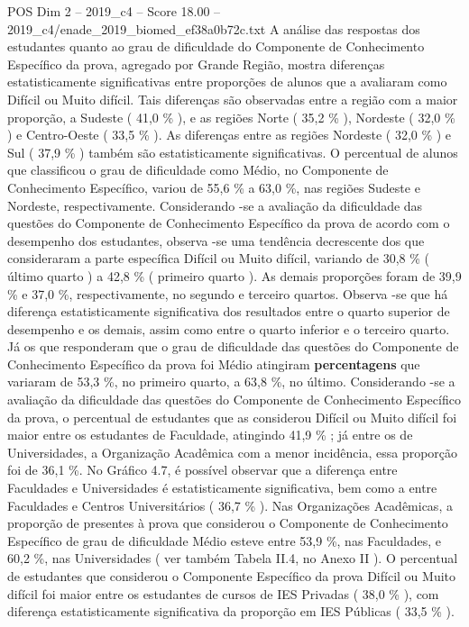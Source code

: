 \begin{textsample}{POS Dim 2 – 2019\_c4 – Score 18.00 – 2019\_c4/enade\_2019\_biomed\_ef38a0b72c.txt}
A análise das respostas dos estudantes quanto ao grau de dificuldade do Componente de Conhecimento Específico da prova, agregado por Grande Região, mostra diferenças estatisticamente significativas entre proporções de alunos que a avaliaram como Difícil ou Muito difícil.
Tais diferenças são observadas entre a região com a maior proporção, a Sudeste ( 41,0 \% ), e as regiões Norte ( 35,2 \% ), Nordeste ( 32,0 \% ) e Centro-Oeste ( 33,5 \% ).
As diferenças entre as regiões Nordeste ( 32,0 \% ) e Sul ( 37,9 \% ) também são estatisticamente significativas.
O percentual de alunos que classificou o grau de dificuldade como Médio, no Componente de Conhecimento Específico, variou de 55,6 \% a 63,0 \%, nas regiões Sudeste e Nordeste, respectivamente.
Considerando -se a avaliação da dificuldade das questões do Componente de Conhecimento Específico da prova de acordo com o desempenho dos estudantes, observa -se uma tendência decrescente dos que consideraram a parte específica Difícil ou Muito difícil, variando de 30,8 \% ( último quarto ) a 42,8 \% ( primeiro quarto ).
As demais proporções foram de 39,9 \% e 37,0 \%, respectivamente, no segundo e terceiro quartos.
Observa -se que há diferença estatisticamente significativa dos resultados entre o quarto superior de desempenho e os demais, assim como entre o quarto inferior e o terceiro quarto.
Já os que responderam que o grau de dificuldade das questões do Componente de Conhecimento Específico da prova foi Médio atingiram \textbf{percentagens} que variaram de 53,3 \%, no primeiro quarto, a 63,8 \%, no último.
Considerando -se a avaliação da dificuldade das questões do Componente de Conhecimento Específico da prova, o percentual de estudantes que as considerou Difícil ou Muito difícil foi maior entre os estudantes de Faculdade, atingindo 41,9 \% ; já entre os de Universidades, a Organização Acadêmica com a menor incidência, essa proporção foi de 36,1 \%.
No Gráfico 4.7, é possível observar que a diferença entre Faculdades e Universidades é estatisticamente significativa, bem como a entre Faculdades e Centros Universitários ( 36,7 \% ).
Nas Organizações Acadêmicas, a proporção de presentes à prova que considerou o Componente de Conhecimento Específico de grau de dificuldade Médio esteve entre 53,9 \%, nas Faculdades, e 60,2 \%, nas Universidades ( ver também Tabela II.4, no Anexo II ).
O percentual de estudantes que considerou o Componente Específico da prova Difícil ou Muito difícil foi maior entre os estudantes de cursos de IES Privadas ( 38,0 \% ), com diferença estatisticamente significativa da proporção em IES Públicas ( 33,5 \% ).

\end{textsample}
